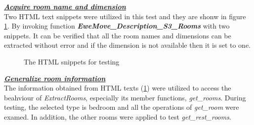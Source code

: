 \documentclass[12pt,twoside]{report}
\begin{document}
\textbf{\textit{\underline{Acquire room name and dimension}}} \\
Two HTML text snippets were utilized in this test and they are shonw in figure \ref{html_room_info_test}. By invoking function \textit{\textbf{EweMove\_Description\_S3\_Rooms}} with two snippets. It can be verified that all the room names and dimensions can be extracted without error and if the dimension is not available then it is set to one. 
\\
\begin{figure}[h]
	\centering
	\hfill
	\caption{The HTML snippets for testing}
	\label{html_room_info_test}
\end{figure}

\textbf{\textit{\underline{Generalize room information}}} \\
The information obtained from HTML texts (\ref{html_room_info_test}) were utilized to access the beahviour of \textit{ExtractRooms}, especially its member functions, \textit{get\_rooms}. During testing, the selected type is bedroom and all the operations of \textit{get\_room} were examed. In addition, the other rooms were applied to test \textit{get\_rest\_rooms}. 
\\
\end{document}
